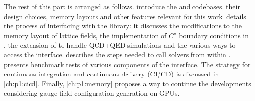 The rest of this part is arranged as follows.
 introduce the \openqxd and \quda codebases, their design choices, memory layouts and other features relevant for this work.
details the process of interfacing \openqxd with the \quda library: it discusses the modifications to the memory layout of lattice fields, the implementation of $C^\star$ boundary conditions in \quda, the extension of \quda to handle QCD+QED simulations and the various ways to access the interface.
 describes the steps needed to call \quda solvers
from within \openqxd.
 presents benchmark tests of various components of the interface.
The strategy for continuous integration and continuous delivery (CI/CD) is discussed in \cref{ch:p1:cicd}.
Finally, \cref{ch:p1:memory} proposes a way to continue the developments
considering gauge field configuration generation on GPUs.



